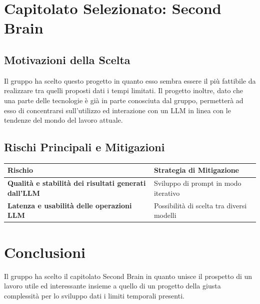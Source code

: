 \section{Capitolato Selezionato: {Second Brain}}

\subsection{Motivazioni della Scelta}
Il gruppo ha scelto questo progetto in quanto esso sembra essere il più fattibile da realizzare tra quelli proposti dati i tempi limitati.
Il progetto inoltre, dato che una parte delle tecnologie è già in parte conosciuta dal gruppo, permetterà ad esso di concentrarsi sull'utilizzo ed interazione con un LLM in linea con le tendenze del mondo del lavoro attuale.

\subsection{Rischi Principali e Mitigazioni}
\begin{table}[ht]
	\centering
	\renewcommand{\arraystretch}{1.4}
	\begin{tabularx}{\textwidth}{l X}
		\toprule
		\textbf{Rischio} & \textbf{Strategia di Mitigazione} \\
		\midrule
		\textbf{Qualità e stabilità dei risultati generati dall'LLM} & Sviluppo di prompt in modo iterativo \\
		\textbf{Latenza e usabilità delle operazioni LLM} & {Possibilità di scelta tra diversi modelli} \\
		\bottomrule
	\end{tabularx}
\end{table}

\section{Conclusioni}
Il gruppo ha scelto il capitolato Second Brain in quanto unisce il prospetto di un lavoro utile ed interessante insieme a quello di un progetto della giusta complessità per lo sviluppo dati i limiti temporali presenti.